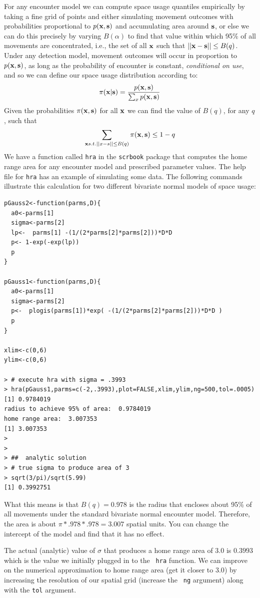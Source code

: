 For any encounter model we can compute space usage quantiles
empirically by taking a fine grid of points and either simulating
movement outcomes with probabilities proportional to $p({\bf x},{\bf s})$ and
accumulating area around ${\bf s}$, or else we can do this precisely
by varying $B(\alpha)$ to find that value within which 95\% of all
movements are concentrated, i.e., the set of all ${\bf x}$ such that
$||{\bf x}-{\bf s}|| \le B(q)$.  Under any detection model,
  movement outcomes will occur in proportion to $p({\bf x},{\bf s})$,
  as long as the probability of encounter is constant, {\it
    conditional on use}, and so we can define our space usage
  distribution according to:
\[
 \pi({\bf x}|{\bf s}) =\frac{p({\bf x},{\bf s})}{\sum_{x} p({\bf
     x},{\bf s}) }
\]
Given the probabilities $\pi({\bf x},{\bf s})$ for all ${\bf x}$ we
can find the value of $B(q)$, for any $q$, such that
\[
\sum_{{\bf x}
  s.t. ||x-s|| \le B(q) } \pi({\bf x},{\bf s}) \le 1-q
\] 
We have a function
called \mbox{\tt hra} in the \mbox{\tt scrbook} package that computes
the home range area for any encounter model and prescribed parameter values. The help file
for \mbox{\tt hra} has an example of simulating some data.
The following commands illustrate this calculation for two different bivariate normal models of space usage:
{\small 
\begin{verbatim}
pGauss2<-function(parms,D){
  a0<-parms[1]
  sigma<-parms[2]
  lp<-  parms[1] -(1/(2*parms[2]*parms[2]))*D*D
  p<- 1-exp(-exp(lp))
  p
}

pGauss1<-function(parms,D){
  a0<-parms[1]
  sigma<-parms[2]
  p<-  plogis(parms[1])*exp( -(1/(2*parms[2]*parms[2]))*D*D )
  p
}

xlim<-c(0,6)
ylim<-c(0,6)

> # execute hra with sigma = .3993
> hra(pGauss1,parms=c(-2,.3993),plot=FALSE,xlim,ylim,ng=500,tol=.0005)
[1] 0.9784019
radius to achieve 95% of area:  0.9784019
home range area:  3.007353
[1] 3.007353
>
> 
> ##  analytic solution
> # true sigma to produce area of 3
> sqrt(3/pi)/sqrt(5.99)
[1] 0.3992751
\end{verbatim}
}
What this means is that $B(q) = 0.978$ is the radius that
encloses about 95\% of all movements under the standard bivariate
normal encounter model.  Therefore, the area is about $\pi*.978*.978 =
3.007$ spatial units.  You can change the intercept of the model and
find that it has no effect. 

The actual
(analytic) value of $\sigma$ that produces a home range area of 3.0 is
$0.3993$ which is the value we initially plugged in to the \mbox{\tt
  hra} function. We can improve on the numerical approximation to home range
area (get it closer to $3.0$) by increasing 
the resolution of our spatial grid (increase the \mbox{\tt
  ng} argument) along with the \mbox{\tt tol} argument.

